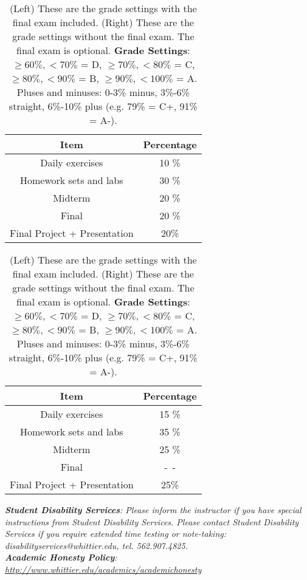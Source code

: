 \documentclass[10pt]{article}
\begin{document}
\begin{table}[h]
\centering
\begin{tabular}{| c | c |}
\hline
Item & Percentage \\ \hline \hline
Daily exercises & 10 \% \\ \hline
Homework sets and labs & 30 \% \\ \hline
Midterm & 20 \% \\ \hline
Final & 20 \% \\ \hline
Final Project + Presentation & 20\% \\ \hline
\end{tabular}
\begin{tabular}{| c | c |}
\hline
Item & Percentage \\ \hline \hline
Daily exercises & 15 \% \\ \hline
Homework sets and labs & 35 \% \\ \hline
Midterm & 25 \% \\ \hline
Final & -~- \\ \hline
Final Project + Presentation & 25\% \\ \hline
\end{tabular}
\caption{\label{tab:grades} (Left) These are the grade settings with the final exam included. (Right) These are the grade settings without the final exam.  The final exam is optional. \textbf{Grade Settings}: $\geq 60\%, <70\%$ = D, $\geq 70\%, <80\%$ = C, $\geq 80\%, <90\%$ = B, $\geq 90\%, <100\%$ = A. Pluses and minuses: 0-3\% minus, 3\%-6\% straight, 6\%-10\% plus (e.g. 79\% = C+, 91\% = A-).}
\end{table}
\noindent
\textit{\textbf{Student Disability Services}: Please inform the instructor if you have special instructions from Student Disability Services.  Please contact Student Disability Services if you require extended time testing or note-taking: disabilityservices@whittier.edu, tel. 562.907.4825.} \\
\textit{\textbf{Academic Honesty Policy}: \url{http://www.whittier.edu/academics/academichonesty}} \\
\noindent
\end{document}

